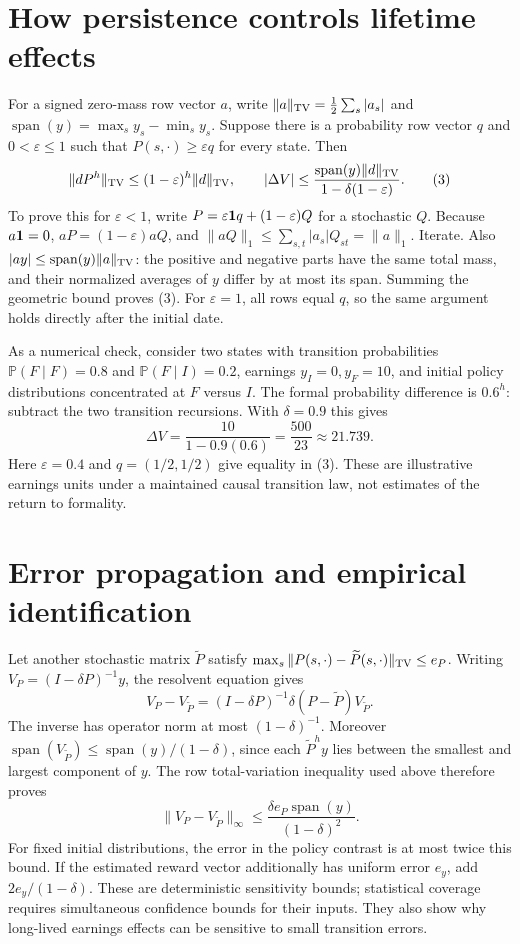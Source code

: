 \documentclass[11pt,a4paper]{article}
\newcommand{\Prob}{\mathbb P}
\begin{document}
\section{How persistence controls lifetime effects}
For a signed zero-mass row vector $a$, write
$\|a\|_{\rm TV}=\tfrac12\sum_s|a_s|$ and
$\operatorname{span}(y)=\max_s y_s-\min_s y_s$.
Suppose there is a probability row vector $q$ and $0<\varepsilon\leq1$
such that $P(s,\cdot)\geq\varepsilon q$ for every state.
Then
\[
 \|dP^h\|_{\rm TV}\leq(1-\varepsilon)^h\|d\|_{\rm TV},\qquad
 |\Delta V|\leq
 \frac{\operatorname{span}(y)\|d\|_{\rm TV}}
      {1-\delta(1-\varepsilon)}.                           \tag{3}
\]
To prove this for $\varepsilon<1$, write
$P=\varepsilon{\bf1}q+(1-\varepsilon)Q$ for a stochastic $Q$.
Because $a{\bf1}=0$, $aP=(1-\varepsilon)aQ$, and
$\|aQ\|_1\leq\sum_{s,t}|a_s|Q_{st}=\|a\|_1$.
Iterate. Also $|ay|\leq\operatorname{span}(y)\|a\|_{\rm TV}$:
the positive and negative parts have the same total mass, and their
normalized averages of $y$ differ by at most its span. Summing the geometric
bound proves (3). For $\varepsilon=1$, all rows equal $q$, so the same
argument holds directly after the initial date.

As a numerical check, consider two states with transition probabilities
$\Prob(F\mid F)=0.8$ and $\Prob(F\mid I)=0.2$, earnings $y_I=0,y_F=10$,
and initial policy distributions concentrated at $F$ versus $I$. The formal
probability difference is $0.6^h$: subtract the two transition recursions.
With $\delta=0.9$ this gives
\[
 \Delta V=\frac{10}{1-0.9(0.6)}=\frac{500}{23}\approx21.739.
\]
Here $\varepsilon=0.4$ and $q=(1/2,1/2)$ give equality in (3).
These are illustrative earnings units under a maintained causal transition
law, not estimates of the return to formality.

\section{Error propagation and empirical identification}
Let another stochastic matrix $\widetilde P$ satisfy
$\max_s\|P(s,\cdot)-\widetilde P(s,\cdot)\|_{\rm TV}\leq e_P$.
Writing $V_P=(I-\delta P)^{-1}y$, the resolvent equation gives
\[
 V_P-V_{\widetilde P}
 =(I-\delta P)^{-1}\delta(P-\widetilde P)V_{\widetilde P}.
\]
The inverse has operator norm at most $(1-\delta)^{-1}$.
Moreover
$\operatorname{span}(V_{\widetilde P})
 \leq\operatorname{span}(y)/(1-\delta)$, since each
$\widetilde P^hy$ lies between the smallest and largest component of $y$.
The row total-variation inequality used above therefore proves
\[
 \|V_P-V_{\widetilde P}\|_\infty
 \leq\frac{\delta e_P\operatorname{span}(y)}{(1-\delta)^2}.
\]
For fixed initial distributions, the error in the policy contrast is at most
twice this bound. If the estimated reward vector additionally has uniform
error $e_y$, add $2e_y/(1-\delta)$. These are deterministic sensitivity
bounds; statistical coverage requires simultaneous confidence bounds for
their inputs. They also show why long-lived earnings effects can be sensitive
to small transition errors.
\end{document}
